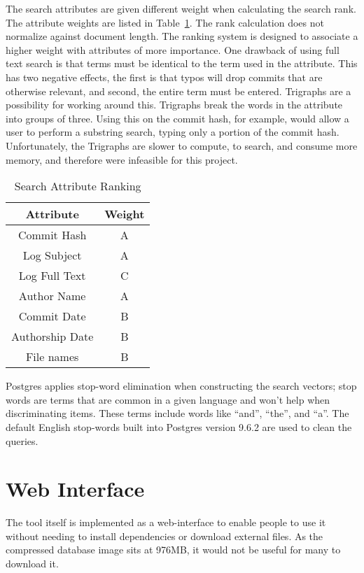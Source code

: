 The search attributes are given different weight when calculating the
search rank. The attribute weights are listed in
Table~\ref{tab:search_attribute_rank}. The rank calculation does not
normalize against document length. The ranking system is designed to
associate a higher weight with attributes of more importance. One
drawback of using full text search is that terms must be identical to
the term used in the attribute. This has two negative effects, the first
is that typos will drop commits that are otherwise relevant, and second,
the entire term must be entered. Trigraphs are a possibility for working
around this. Trigraphs break the words in the attribute into groups of
three. Using this on the commit hash, for example, would allow a user to
perform a substring search, typing only a portion of the commit hash.
Unfortunately, the Trigraphs are slower to compute, to search, and
consume more memory, and therefore were infeasible for this project.

\begin{table}[htpb]
  \centering
  \caption{Search Attribute Ranking}
  \label{tab:search_attribute_rank}
  \begin{tabular}{cc}
    \toprule
    Attribute       & Weight\\
    \midrule
    Commit Hash     & A \\
    Log Subject     & A \\
    Log Full Text   & C \\
    Author Name     & A \\
    Commit Date     & B \\
    Authorship Date & B \\
    File names      & B \\
    \bottomrule
  \end{tabular}
\end{table}

Postgres applies stop-word elimination when constructing the search
vectors; stop words are terms that are common in a given language and
won't help when discriminating items. These terms include words like
``and'', ``the'', and ``a''. The default English stop-words built into
Postgres version 9.6.2 are used to clean the queries.

\section{Web Interface}\label{sec:web_interface}

The tool itself is implemented as a web-interface to enable people to
use it without needing to install dependencies or download external
files. As the compressed database image sits at 976MB, it would not be
useful for many to download it.

